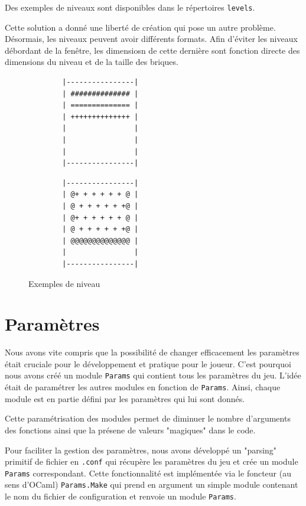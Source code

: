 \documentclass[french]{template}
\begin{document}
Des exemples de niveaux sont disponibles dans le répertoires \texttt{levels}.

Cette solution a donné une liberté de création qui pose un autre problème. Désormais, les niveaux peuvent avoir différents formats. Afin d'éviter les niveaux débordant de la fenêtre, les dimensiosn de cette dernière sont fonction directe des dimensions du niveau et de la taille des briques.

\begin{figure}
    \begin{minipage}{0.4\textwidth}
        \begin{verbatim}
        |----------------|
        | ############## |
        | ============== |
        | ++++++++++++++ |
        |                |
        |                |
        |                |
        |----------------|
        \end{verbatim}
    \end{minipage}
    \hfill
    \begin{minipage}{0.4\textwidth}
        \begin{verbatim}
        |----------------|
        | @+ + + + + + @ |
        | @ + + + + + +@ |
        | @+ + + + + + @ |
        | @ + + + + + +@ |
        | @@@@@@@@@@@@@@ |
        |                |
        |----------------|
        \end{verbatim}
    \end{minipage}
    \caption{Exemples de niveau}
    \label{fig:level.txt}
\end{figure}

\section{Paramètres}

Nous avons vite compris que la possibilité de changer efficacement les paramètres était cruciale pour le développement et pratique pour le joueur. C'est pourquoi nous avons créé un module \texttt{Params} qui contient tous les paramètres du jeu. L'idée était de paramétrer les autres modules en fonction de \texttt{Params}. Ainsi, chaque module est en partie défini par les paramètres qui lui sont donnés.

Cette paramétrisation des modules permet de diminuer le nombre d'arguments des fonctions ainsi que la présene de valeurs "magiques" dans le code.

Pour faciliter la gestion des paramètres, nous avons développé un "parsing" primitif de fichier en \texttt{.conf} qui récupère les paramètres du jeu et crée un module \texttt{Params} correspondant. Cette fonctionnalité est implémentée via le foncteur (au sens d'OCaml) \texttt{Params.Make} qui prend en argument un simple module contenant le nom du fichier de configuration et renvoie un module \texttt{Params}.
\end{document}
